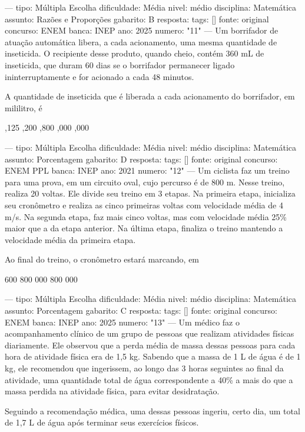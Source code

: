 ---
tipo: Múltipla Escolha
dificuldade: Média
nivel: médio
disciplina: Matemática
assunto: Razões e Proporções
gabarito: B
resposta:
tags: []
fonte: original
concurso: ENEM
banca: INEP
ano: 2025
numero: "11"
---
\question
Um borrifador de atuação automática libera, a cada acionamento, uma mesma quantidade de inseticida. O recipiente desse produto, quando cheio, contém 360 mL de inseticida, que duram 60 dias se o borrifador permanecer ligado ininterruptamente e for acionado a cada 48 minutos.

A quantidade de inseticida que é liberada a cada acionamento do borrifador, em mililitro, é
\begin{choices}
,125
,200
,800
,000
,000
\end{choices}

---
tipo: Múltipla Escolha
dificuldade: Média
nivel: médio
disciplina: Matemática
assunto: Porcentagem
gabarito: D
resposta:
tags: []
fonte: original
concurso: ENEM PPL
banca: INEP
ano: 2021
numero: "12"
---
\question
Um ciclista faz um treino para uma prova, em um circuito oval, cujo percurso é de 800 m. Nesse treino, realiza 20 voltas. Ele divide seu treino em 3 etapas. Na primeira etapa, inicializa seu cronômetro e realiza as cinco primeiras voltas com velocidade média de 4 m/s. Na segunda etapa, faz mais cinco voltas, mas com velocidade média 25\% maior que a da etapa anterior. Na última etapa, finaliza o treino mantendo a velocidade média da primeira etapa.

Ao final do treino, o cronômetro estará marcando, em
\begin{choices}
 600
 800
 000
 800
 000
\end{choices}

---
tipo: Múltipla Escolha
dificuldade: Média
nivel: médio
disciplina: Matemática
assunto: Porcentagem
gabarito: C
resposta:
tags: []
fonte: original
concurso: ENEM
banca: INEP
ano: 2025
numero: "13"
---
\question
Um médico faz o acompanhamento clínico de um grupo de pessoas que realizam atividades físicas diariamente. Ele observou que a perda média de massa dessas pessoas para cada hora de atividade física era de 1,5 kg. Sabendo que a massa de 1 L de água é de 1 kg, ele recomendou que ingerissem, ao longo das 3 horas seguintes ao final da atividade, uma quantidade total de água correspondente a 40\% a mais do que a massa perdida na atividade física, para evitar desidratação.

Seguindo a recomendação médica, uma dessas pessoas ingeriu, certo dia, um total de 1,7 L de água após terminar seus exercícios físicos.

